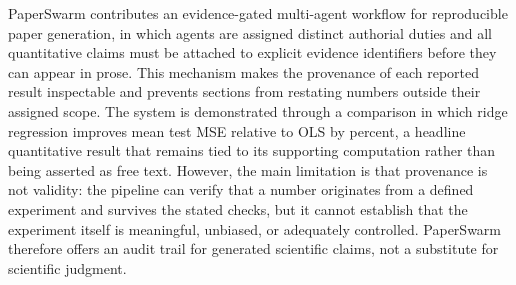 PaperSwarm contributes an evidence-gated multi-agent workflow for reproducible paper generation, in which agents are assigned distinct authorial duties and all quantitative claims must be attached to explicit evidence identifiers before they can appear in prose. This mechanism makes the provenance of each reported result inspectable and prevents sections from restating numbers outside their assigned scope. The system is demonstrated through a comparison in which ridge regression improves mean test MSE relative to OLS by  percent, a headline quantitative result that remains tied to its supporting computation rather than being asserted as free text. However, the main limitation is that provenance is not validity: the pipeline can verify that a number originates from a defined experiment and survives the stated checks, but it cannot establish that the experiment itself is meaningful, unbiased, or adequately controlled. PaperSwarm therefore offers an audit trail for generated scientific claims, not a substitute for scientific judgment.
